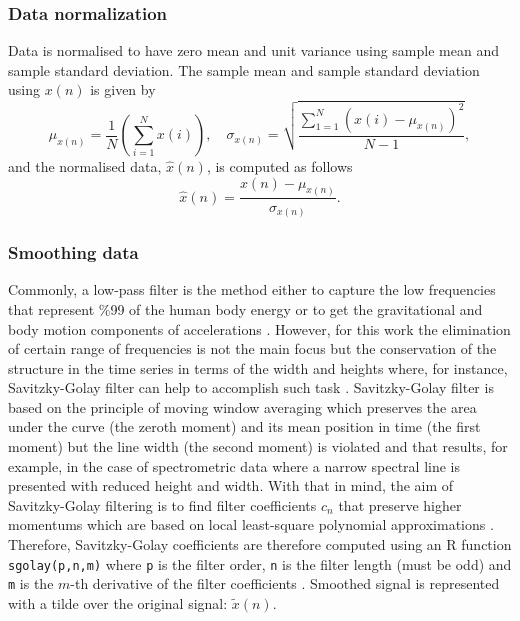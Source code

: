 \documentclass[fleqn,10pt]{wlscirep}
\begin{document}
\subsubsection*{Data normalization}
Data is normalised to have zero mean and unit variance 
using sample mean and sample standard deviation.
The sample mean and sample standard deviation using $x(n)$ is given by
\begin{equation}\label{eq:ms}
\mu_{x(n)}= \frac{1}{N} ( \sum_{i=1}^N x(i) ), \quad 
	\sigma_{x(n)} =  \sqrt{ \frac{  \sum_{1=1}^N ( x(i) - \mu_{x(n)} )^2 }{ N-1 }  },      
\end{equation}
and the normalised data, $\hat{x}(n)$, is computed as follows
\begin{equation}\label{eq:normalization}
\hat{x} (n) = \frac{   x(n) -  \mu_{x(n)}  }{   \sigma_{x(n)} }.   
\end{equation}

\subsubsection*{Smoothing data}
Commonly, a low-pass filter is the method either to capture the low 
frequencies that represent \%99 of the human body energy or to get 
the gravitational and body motion components of 
accelerations \cite{anguita2013}. However, for this work the elimination of 
certain range of frequencies is not the main focus but the conservation of 
the structure in the time series in terms of the width and heights where, 
for instance, Savitzky-Golay filter can help to accomplish 
such task \cite{press1992}. Savitzky-Golay filter is based on the 
principle of moving window averaging which preserves the area under 
the curve (the zeroth moment) and its mean position in time 
(the first moment) but the line width (the second moment) is violated 
and that results, for example, in the case of spectrometric data
where a narrow spectral line is presented with reduced height and width. 
With that in mind, the aim of Savitzky-Golay filtering is to find filter 
coefficients $c_n$ that preserve higher momentums which are based on local 
least-square polynomial approximations \cite{savitzkygolay1964, 
press1992, schafer2011}.
Therefore, Savitzky-Golay coefficients are therefore computed using 
an R function \texttt{sgolay(p,n,m)} where \texttt{p} is the filter order, 
\texttt{n} is the filter length (must be odd) and \texttt{m} is the 
$m$-th derivative of the filter coefficients  \cite{Rsignal}. 
Smoothed signal is represented with a tilde over the original 
signal: $\tilde{x}(n)$.
\end{document}
